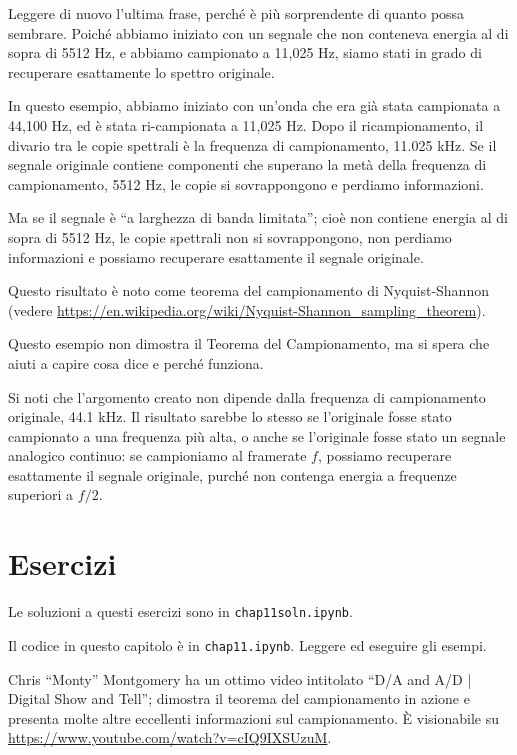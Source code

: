 \documentclass[12pt,a4paper]{book}
\begin{document}
Leggere di nuovo l'ultima frase, perché è più sorprendente di quanto possa sembrare. Poiché abbiamo iniziato con un segnale che non conteneva energia al di sopra di 5512 Hz, e abbiamo campionato a 11,025 Hz, siamo stati in grado di recuperare esattamente lo spettro originale.

In questo esempio, abbiamo iniziato con un'onda che era già stata campionata a 44,100 Hz, ed è stata ri-campionata a 11,025 Hz. Dopo il ricampionamento, il divario tra le copie spettrali è la frequenza di campionamento, 11.025 kHz. Se il segnale originale contiene componenti che superano la metà della frequenza di campionamento, 5512 Hz, le copie si sovrappongono e perdiamo informazioni.

Ma se il segnale è ``a larghezza di banda limitata''; cioè non contiene energia al di sopra di 5512 Hz, le copie spettrali non si sovrappongono, non perdiamo informazioni e possiamo recuperare esattamente il segnale originale.

Questo risultato è noto come teorema del campionamento di Nyquist-Shannon (vedere \url{https://en.wikipedia.org/wiki/Nyquist-Shannon_sampling_theorem}).

Questo esempio non dimostra il Teorema del Campionamento, ma si spera che aiuti a capire cosa dice e perché funziona.

Si noti che l'argomento creato non dipende dalla frequenza di campionamento originale, 44.1 kHz. Il risultato sarebbe lo stesso se l'originale fosse stato campionato a una frequenza più alta, o anche se l'originale fosse stato un segnale analogico continuo: se campioniamo al framerate $f$, possiamo recuperare esattamente il segnale originale, purché non contenga energia a frequenze superiori a $f/2$.

\section{Esercizi} 

Le soluzioni a questi esercizi sono in {\tt chap11soln.ipynb}.

\begin{exercise} Il codice in questo capitolo è in {\tt chap11.ipynb}. Leggere ed eseguire gli esempi. \end{exercise} 

\begin{exercise} Chris ``Monty'' Montgomery ha un ottimo video intitolato ``D/A and A/D | Digital Show and Tell''; dimostra il teorema del campionamento in azione e presenta molte altre eccellenti informazioni sul campionamento. È visionabile su \url{https://www.youtube.com/watch?v=cIQ9IXSUzuM}. \end{exercise} 
\end{document}

